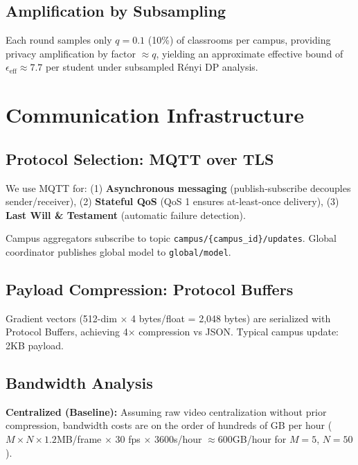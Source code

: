 \documentclass[conference]{IEEEtran}
\begin{document}
\subsection{Amplification by Subsampling}

Each round samples only $q = 0.1$ (10\%) of classrooms per campus, providing privacy amplification by factor $\approx q$, yielding an approximate effective bound of $\epsilon_{\text{eff}} \approx 7.7$ per student under subsampled R\'enyi DP analysis.

\section{Communication Infrastructure}

\subsection{Protocol Selection: MQTT over TLS}

We use MQTT for: (1) \textbf{Asynchronous messaging} (publish-subscribe decouples sender/receiver), (2) \textbf{Stateful QoS} (QoS 1 ensures at-least-once delivery), (3) \textbf{Last Will \& Testament} (automatic failure detection).

Campus aggregators subscribe to topic \texttt{campus/\{campus\_id\}/updates}. Global coordinator publishes global model to \texttt{global/model}.

\subsection{Payload Compression: Protocol Buffers}

Gradient vectors (512-dim $\times$ 4 bytes/float = 2,048 bytes) are serialized with Protocol Buffers, achieving 4$\times$ compression vs JSON. Typical campus update: 2KB payload.

\subsection{Bandwidth Analysis}

\textbf{Centralized (Baseline):} Assuming raw video centralization without prior compression, bandwidth costs are on the order of hundreds of GB per hour ($M \times N \times 1.2$MB/frame $\times$ 30 fps $\times$ 3600s/hour $\approx 600$GB/hour for $M=5$, $N=50$).
\end{document}
